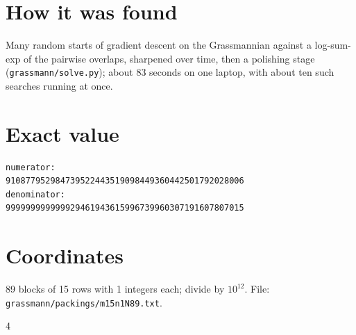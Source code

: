 \documentclass[11pt,a4paper]{article}
\begin{document}
\section{How it was found}
Many random starts of gradient descent on the Grassmannian against a log-sum-exp of the pairwise overlaps, sharpened over time, then a polishing stage (\texttt{grassmann/solve.py}); about 83 seconds on one laptop, with about ten such searches running at once.


\appendix
\section{Exact value}
{\small
\begin{verbatim}
numerator:
910877952984739522443519098449360442501792028006
denominator:
999999999999929461943615996739960307191607807015
\end{verbatim}}

\section{Coordinates}
89 blocks of 15 rows with 1 integers each; divide by $10^{12}$. File: \texttt{grassmann/packings/m15n1N89.txt}.
{\tiny
\begin{multicols}{4}
\end{multicols}}
\end{document}
